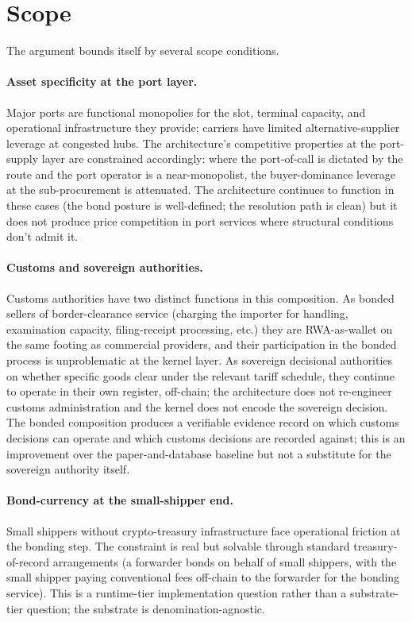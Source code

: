 \documentclass[11pt,a4paper]{article}
\theoremstyle{definition}
\theoremstyle{remark}
\begin{document}
\section{Scope}
\label{sec:scope}

The argument bounds itself by several scope conditions.

\paragraph{Asset specificity at the port layer.}
Major ports are functional monopolies for the slot, terminal
capacity, and operational infrastructure they provide; carriers
have limited alternative-supplier leverage at congested hubs.
The architecture's competitive properties at the port-supply
layer are constrained accordingly: where the port-of-call is
dictated by the route and the port operator is a near-monopolist,
the buyer-dominance leverage at the sub-procurement is
attenuated. The architecture continues to function in these
cases (the bond posture is well-defined; the resolution path is
clean) but it does not produce price competition in port
services where structural conditions don't admit it.

\paragraph{Customs and sovereign authorities.}
Customs authorities have two distinct functions in this
composition. As bonded sellers of border-clearance service
(charging the importer for handling, examination capacity,
filing-receipt processing, etc.) they are RWA-as-wallet on the
same footing as commercial providers, and their participation in
the bonded process is unproblematic at the kernel layer. As
sovereign decisional authorities on whether specific goods clear
under the relevant tariff schedule, they continue to operate in
their own register, off-chain; the architecture does not
re-engineer customs administration and the kernel does not
encode the sovereign decision. The bonded composition produces a
verifiable evidence record on which customs decisions can operate
and which customs decisions are recorded against; this is an
improvement over the paper-and-database baseline but not a
substitute for the sovereign authority itself.

\paragraph{Bond-currency at the small-shipper end.}
Small shippers without crypto-treasury infrastructure face
operational friction at the bonding step. The constraint is
real but solvable through standard treasury-of-record
arrangements (a forwarder bonds on behalf of small shippers,
with the small shipper paying conventional fees off-chain to the
forwarder for the bonding service). This is a runtime-tier
implementation question rather than a substrate-tier question;
the substrate is denomination-agnostic.
\end{document}
